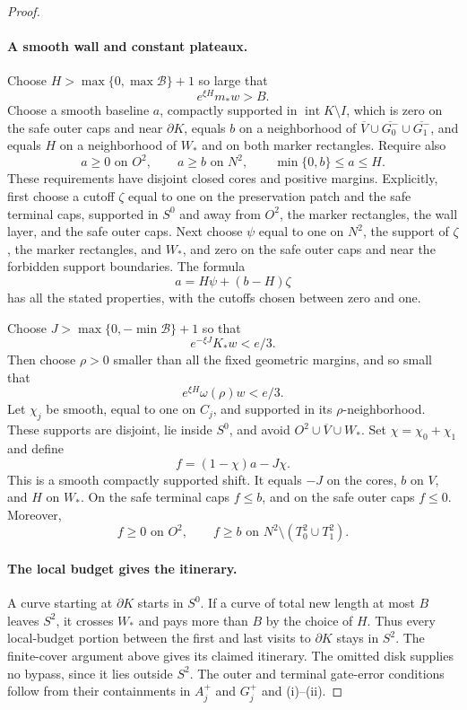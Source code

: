 \begin{proof}
\paragraph{A smooth wall and constant plateaux.}
Choose $H>\max\{0,\max\mathcal B\}+1$ so large that
\[
 e^{\xi H}m_*w>B.
\]
Choose a smooth baseline $a$, compactly supported in
$\operatorname{int}K\setminus I$, which is zero on the
safe outer caps and near $\partial K$, equals $b$ on a
neighborhood of $\overline V\cup\overline{G_0^-}
\cup\overline{G_1^-}$, and equals $H$ on a neighborhood
of $W_*$ and on both marker rectangles.  Require also
\[
 a\ge0\text{ on }O^2,
 \qquad a\ge b\text{ on }N^2,
 \qquad \min\{0,b\}\le a\le H.
\]
These requirements have disjoint closed cores and positive
margins.  Explicitly, first choose a cutoff $\zeta$ equal
to one on the preservation patch and the safe terminal
caps, supported in $S^0$ and away from $O^2$, the marker rectangles,
the wall layer, and the safe outer caps.  Next choose
$\psi$ equal to one on $N^2$, the support of $\zeta$,
the marker rectangles, and $W_*$, and zero on the safe
outer caps and near the forbidden support boundaries.
The formula
\[
 a=H\psi+(b-H)\zeta
\]
has all the stated properties, with the cutoffs chosen
between zero and one.

Choose $J>\max\{0,-\min\mathcal B\}+1$ so that
\[
 e^{-\xi J}K_*w<e/3.
\]
Then choose $\rho>0$ smaller than all the fixed geometric
margins, and so small that
\[
 e^{\xi H}\omega(\rho)w<e/3.
\]
Let $\chi_j$ be smooth, equal to one on $C_j$, and supported
in its $\rho$-neighborhood.  These supports are disjoint,
lie inside $S^0$, and avoid $O^2\cup\overline V\cup W_*$.
Set $\chi=\chi_0+\chi_1$ and define
\[
 f=(1-\chi)a-J\chi.
\]
This is a smooth compactly supported shift.  It equals
$-J$ on the cores, $b$ on $V$, and $H$ on $W_*$.  On
the safe terminal caps $f\le b$, and on the safe outer
caps $f\le0$.  Moreover,
\[
 f\ge0\text{ on }O^2,
 \qquad
 f\ge b\text{ on }N^2\setminus(T_0^2\cup T_1^2).
\]

\paragraph{The local budget gives the itinerary.}
A curve starting at $\partial K$ starts in $S^0$.
If a curve of total new length at most $B$ leaves $S^2$,
it crosses $W_*$ and pays more than $B$ by the choice
of $H$.  Thus every local-budget portion between the first
and last visits to $\partial K$ stays in $S^2$.  The
finite-cover argument above gives its claimed itinerary.
The omitted disk supplies no bypass, since it lies outside
$S^2$.  The outer and terminal gate-error conditions follow
from their containments in $A_j^+$ and $G_j^+$ and (i)--(ii).


\end{proof}
